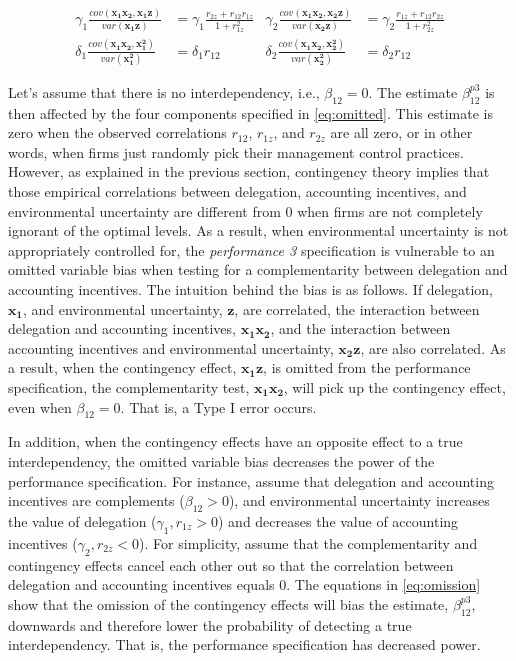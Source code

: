 \documentclass[12pt]{article}
\begin{document}
\begin{equation}\label{eq:omitted}
\begin{aligned}
\gamma_1 \frac{cov(\mathbf{x_1 x_2}, \mathbf{x_1 z})}{var(\mathbf{x_1 z})} &= 
\gamma_1 \frac{r_{2z} + r_{12} r_{1z}}{1 + r_{1z}^2}
&\gamma_2 \frac{cov(\mathbf{x_1 x_2}, \mathbf{x_2 z})}{var(\mathbf{x_2 z})} &= 
\gamma_2 \frac{r_{1z} + r_{12} r_{2z}}{1 + r_{2z}^2}
\\
\delta_1 \frac{cov(\mathbf{x_1 x_2}, \mathbf{x_1^2})}{var(\mathbf{x_1^2})} &= 
\delta_1 r_{12}
&\delta_2 \frac{cov(\mathbf{x_1 x_2}, \mathbf{x_2^2})}{var(\mathbf{x_2^2})} &= 
\delta_2 r_{12}
\end{aligned}
\end{equation}

Let's assume that there is no interdependency, i.e., $\beta_{12}=0$. The estimate $\beta^{p3}_{12}$ is then affected by the four components specified in \eqref{eq:omitted}. This estimate is zero when the observed correlations $r_{12}$, $r_{1z}$, and $r_{2z}$ are all zero, or in other words, when firms just randomly pick their management control practices. However, as explained in the previous section, contingency theory implies that those empirical correlations between delegation, accounting incentives, and environmental uncertainty are different from $0$ when firms are not completely ignorant of the optimal levels. As a result, when environmental uncertainty is not appropriately controlled for, the \emph{performance 3} specification is vulnerable to an omitted variable bias when testing for a complementarity between delegation and accounting incentives. The intuition behind the bias is as follows. If delegation, $\mathbf{x_1}$, and environmental uncertainty, $\mathbf{z}$, are correlated, the interaction between delegation and accounting incentives, $\mathbf{x_1 x_2}$, and the interaction between accounting incentives and environmental uncertainty, $\mathbf{x_2 z}$, are also correlated. As a result, when the contingency effect, $\mathbf{x_1 z}$, is omitted from the performance specification, the complementarity test, $\mathbf{x_1 x_2}$, will pick up the contingency effect, even when $\beta_{12}=0$. That is, a Type I error occurs.

In addition, when the contingency effects have an opposite effect to a true interdependency, the omitted variable bias decreases the power of the performance specification. For instance, assume that delegation and accounting incentives are complements ($\beta_{12} > 0$), and environmental uncertainty increases the value of delegation ($\gamma_1, r_{1z} > 0$) and decreases the value of accounting incentives ($\gamma_2, r_{2z} < 0$). For simplicity, assume that the complementarity and contingency effects cancel each other out so that the correlation between delegation and accounting incentives equals $0$. The equations in \eqref{eq:omission} show that the omission of the contingency effects will bias the estimate, $\beta_{12}^{p3}$, downwards and therefore lower the probability of detecting a true interdependency. That is, the performance specification has decreased power.
 
\end{document}
